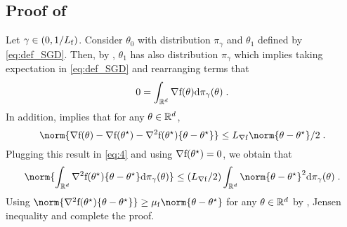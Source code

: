\subsection{Proof of }
\label{sec:proof-crefpropo:bias}
  Let $\gamma \in \left(0,1/L_{\mathrm{f}}\right)$.
  Consider $\theta_0$ with distribution $\pi_{\gamma}$   and $\theta_1$ defined by \eqref{eq:def_SGD}. Then, by , $\theta_1$ has also distribution $\pi_{\gamma}$ which implies taking expectation in \eqref{eq:def_SGD} and rearranging terms that
  \begin{equation}
    \label{eq:4}
    0 = \int_{\mathbb{R}^d} \nabla \mathrm{f}(\theta) \mathrm{d} \pi_{\gamma}(\theta) \;.
  \end{equation}
  In addition, \cite[]{nesterov:2004} implies that for any $\theta \in\mathbb{R}^d$,
  \begin{equation*}
    \norm{\nabla \objf(\theta) - \nabla \objf(\thetas) - \nabla^2 \objf(\thetas)\{\theta - \thetas\}} \leq \LipHessianf\norm{\theta-\thetas}/2 \eqsp.
  \end{equation*}
  Plugging this result in \eqref{eq:4} and using $\nabla \mathrm{f}(\theta^{\star}) =0$, we obtain that
  \begin{equation*}
    \label{eq:5}
    \norm{\int_{\rset^d} \nabla^2 \objf(\thetas)\{\theta - \thetas\} \rmd \pi_{\gamma}(\theta)} \leq
    (\LipHessianf/2)\int_{\rset^d} \norm{\theta-\thetas}^2  \rmd \pi_{\gamma}(\theta) \eqsp.
  \end{equation*}
Using   $\norm{\nabla^2 \objf(\thetas)\{\theta - \thetas\} } \geq \muf \norm{\theta-\thetas}$ for any $\theta \in\mathbb{R}^d$  by , Jensen inequality and   complete the proof.

